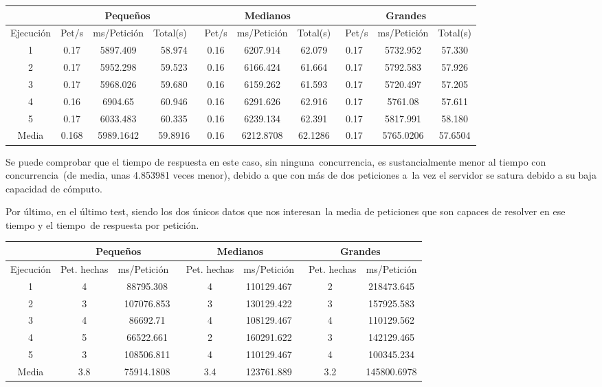 \documentclass[11pt,twoside,a4paper]{book}
\begin{document}
\begin{center}
\small
\begin{tabular}{ |c|c|c|c|c|c|c|c|c|c| }
 \hline
  & \multicolumn{3}{|c}{Pequeños} & \multicolumn{3}{|c|}{Medianos} & \multicolumn{3}{|c|}{Grandes} \\
 \hline
 Ejecución & Pet/s & ms/Petición & Total(s) \
 & Pet/s & ms/Petición & Total(s) &\
 Pet/s & ms/Petición & Total(s) \\
 \hline
 1 & 0.17 & 5897.409 & 58.974 & 0.16 & 6207.914 & 62.079 & 0.17 & 5732.952 & 57.330 \\
 \hline
 2 & 0.17 & 5952.298 & 59.523 & 0.16 & 6166.424 & 61.664 & 0.17 & 5792.583 & 57.926 \\
 \hline
 3 & 0.17 & 5968.026 & 59.680 & 0.16 & 6159.262 & 61.593 & 0.17 & 5720.497 & 57.205 \\
 \hline
 4 & 0.16 & 6904.65 & 60.946 & 0.16 & 6291.626 & 62.916 & 0.17 & 5761.08 & 57.611 \\
 \hline
 5 & 0.17 & 6033.483 & 60.335 & 0.16 & 6239.134 & 62.391 & 0.17 & 5817.991 & 58.180 \\
 \hline
 Media & 0.168 & 5989.1642 & 59.8916 & 0.16 & 6212.8708 & 62.1286 & 0.17 & 5765.0206 & 57.6504 \\
 \hline
\end{tabular}
\end{center}

Se puede comprobar que el tiempo de respuesta en este caso, sin ninguna\break\
concurrencia, es sustancialmente menor al tiempo con concurrencia\
(de media, unas 4.853981 veces menor), debido a que con más de dos peticiones a\
la vez el servidor se satura debido a su baja capacidad de cómputo. \newline

Por último, en el último test, siendo los dos únicos datos que nos interesan\
la media de peticiones que son capaces de resolver en ese tiempo y el tiempo\
de respuesta por petición.

\begin{center}
\small
\begin{tabular}{ |c|c|c|c|c|c|c| }
 \hline
  & \multicolumn{2}{|c}{Pequeños} & \multicolumn{2}{|c|}{Medianos} & \multicolumn{2}{c|}{Grandes} \\
 \hline
 Ejecución & Pet. hechas & ms/Petición \
 & Pet. hechas & ms/Petición &\
 Pet. hechas & ms/Petición \\
 \hline
 1 & 4 & 88795.308 & 4 & 110129.467 & 2 & 218473.645 \\
 \hline
 2 & 3 & 107076.853 & 3 & 130129.422 & 3 & 157925.583 \\
 \hline
 3 & 4 & 86692.71 & 4 & 108129.467 & 4 & 110129.562 \\
 \hline
 4 & 5 & 66522.661 & 2 & 160291.622 & 3 & 142129.465 \\
 \hline
 5 & 3 & 108506.811 & 4 & 110129.467 & 4 & 100345.234 \\
 \hline
 Media & 3.8 & 75914.1808 & 3.4 & 123761.889 & 3.2 & 145800.6978 \\
 \hline
\end{tabular}
\end{center}
\end{document}
